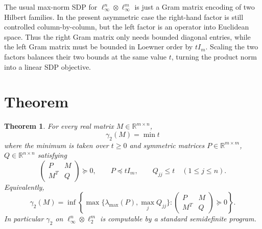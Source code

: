 \documentclass[11pt]{article}
\newtheorem{theorem}{Theorem}
\newcommand{\R}{\mathbb{R}}
\begin{document}
The usual max-norm SDP for $\ell_\infty^n\otimes \ell_\infty^m$ is just a Gram
matrix encoding of two Hilbert families.  In the present asymmetric case the
right-hand factor is still controlled column-by-column, but the left factor is
an operator into Euclidean space.  Thus the right Gram matrix only needs bounded
diagonal entries, while the left Gram matrix must be bounded in Loewner order by
$t I_m$.  Scaling the two factors balances their two bounds at the same value
$t$, turning the product norm into a linear SDP objective.

\section*{Theorem}

\begin{theorem}
For every real matrix $M\in\R^{m\times n}$,
\[
\gamma_2(M)=\min t
\]
where the minimum is taken over $t\ge0$ and symmetric matrices
$P\in\R^{m\times m}$, $Q\in\R^{n\times n}$ satisfying
\[
\begin{pmatrix}
P & M\\
M^T & Q
\end{pmatrix}\succeq 0,\qquad
P\preceq t I_m,\qquad
Q_{jj}\le t\quad(1\le j\le n).
\]
Equivalently,
\[
\gamma_2(M)=
\inf\left\{
\max\{\lambda_{\max}(P),\max_j Q_{jj}\}:
\begin{pmatrix}P&M\\M^T&Q\end{pmatrix}\succeq0
\right\}.
\]
In particular $\gamma_2$ on
$\ell_\infty^n\otimes\ell_2^m$ is computable by a standard semidefinite program.
\end{theorem}
\end{document}
